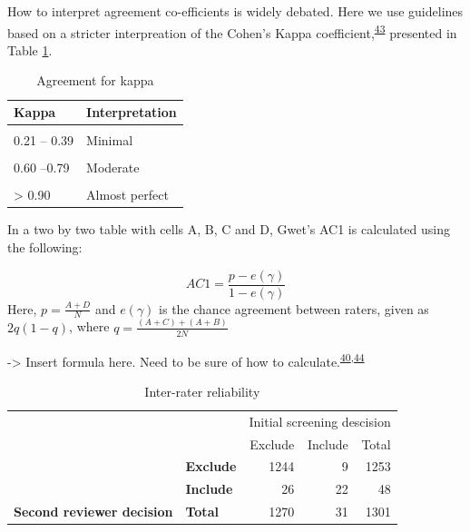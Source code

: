 \documentclass[a4paper, twoside]{templates/ociamthesis}
\begin{document}
How to interpret agreement co-efficients is widely debated. Here we use guidelines based on a stricter interpreation of the Cohen's Kappa coefficient,\textsuperscript{\protect\hyperlink{ref-mchugh2012}{43}} presented in Table \ref{tab:gwet-table}.

\begin{table}[!h]

\caption{\label{tab:gwet-table}Agreement for kappa}
\centering
\begin{tabular}[t]{ll}
\toprule
Kappa & Interpretation\\
\midrule
\cellcolor{gray!6}{0 – 0.20} & \cellcolor{gray!6}{None}\\
0.21 – 0.39 & Minimal\\
\cellcolor{gray!6}{0.40 –.59} & \cellcolor{gray!6}{Weak}\\
0.60 –0.79 & Moderate\\
\cellcolor{gray!6}{0.80–0.90} & \cellcolor{gray!6}{Strong}\\
\addlinespace
> 0.90 & Almost perfect\\
\bottomrule
\end{tabular}
\end{table}

In a two by two table with cells A, B, C and D, Gwet's AC1 is calculated using the following:

\[AC1 = \frac{p-e(\gamma)}{1-e(\gamma)}\]
Here, \(p = \frac{A+D}{N}\) and \(e(\gamma)\) is the chance agreement between raters, given as \(2q(1-q)\), where \(q = \frac{(A+C)+(A+B)}{2N}\)

-\textgreater{} Insert formula here. Need to be sure of how to calculate.\textsuperscript{\protect\hyperlink{ref-gwet2008}{40},\protect\hyperlink{ref-sim2005}{44}}

\begin{table}

\caption{\label{tab:agreementtableinter}Inter-rater reliability}
\centering
\begin{tabular}[t]{>{}l>{}lr>{}r|r}
\toprule
\multicolumn{2}{c}{ } & \multicolumn{3}{c}{Initial screening descision} \\
\cmidrule(l{3pt}r{3pt}){3-5}
 &  & Exclude & Include & Total\\
\midrule
 & \textbf{Exclude} & 1244 & 9 & 1253\\
\cmidrule{2-5}
 & \textbf{Include} & 26 & 22 & 48\\
\cmidrule{2-5}
\multirow{-3}{*}{\raggedright\arraybackslash \textbf{Second reviewer decision}} & \textbf{Total} & 1270 & 31 & 1301\\
\bottomrule
\end{tabular}
\end{table}
\end{document}
